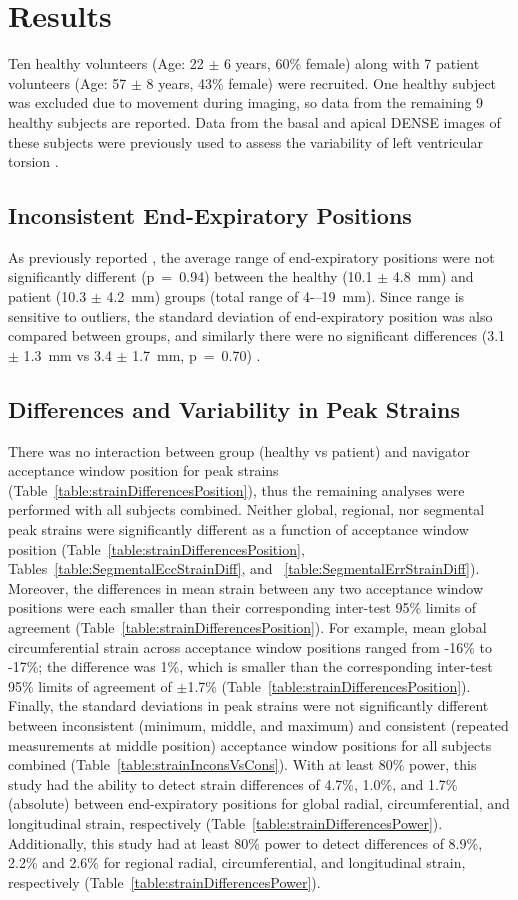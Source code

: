 \section{Results}
	Ten healthy volunteers (Age: 22 $\pm$ 6 years, 60\% female) along with 7 patient volunteers (Age: 57 $\pm$ 8 years, 43\% female) were recruited. One healthy subject was excluded due to movement during imaging, so data from the remaining 9 healthy subjects are reported. Data from the basal and apical DENSE images of these subjects were previously used to assess the variability of left ventricular torsion \cite{Hamlet2017}.
	
\subsection{Inconsistent End-Expiratory Positions}
	As previously reported \cite{Hamlet2017}, the average range of end-expiratory positions were not significantly different (p~=~0.94) between the healthy (10.1 $\pm$ 4.8~mm) and patient (10.3 $\pm$ 4.2~mm) groups (total range of 4-–19~mm). Since range is sensitive to outliers, the standard deviation of end-expiratory position was also compared between groups, and similarly there were no significant differences (3.1 $\pm$ 1.3~mm vs 3.4 $\pm$ 1.7~mm, p~=~0.70) \cite{Hamlet2017}.
	
\subsection{Differences and Variability in Peak Strains}
	There was no interaction between group (healthy vs patient) and navigator acceptance window position for peak strains (Table~\ref{table:strainDifferencesPosition}), thus the remaining analyses were performed with all subjects combined. Neither global, regional, nor segmental peak strains were significantly different as a function of acceptance window position (Table~\ref{table:strainDifferencesPosition}, Tables~\ref{table:SegmentalEccStrainDiff}, and ~\ref{table:SegmentalErrStrainDiff}). Moreover, the differences in mean strain between any two acceptance window positions were each smaller than their corresponding inter-test 95\% limits of agreement (Table~\ref{table:strainDifferencesPosition}). For example, mean global circumferential strain across acceptance window positions ranged from -16\% to -17\%; the difference was 1\%, which is smaller than the corresponding inter-test 95\% limits of agreement of $\pm$1.7\% (Table~\ref{table:strainDifferencesPosition}). Finally, the standard deviations in peak strains were not significantly different between inconsistent (minimum, middle, and maximum) and consistent (repeated measurements at middle position) acceptance window positions for all subjects combined (Table~\ref{table:strainInconsVsCons}). With at least 80\% power, this study had the ability to detect strain differences of 4.7\%, 1.0\%, and 1.7\% (absolute) between end-expiratory positions for global radial, circumferential, and longitudinal strain, respectively (Table~\ref{table:strainDifferencesPower}). Additionally, this study had at least 80\% power to detect differences of 8.9\%, 2.2\% and 2.6\% for regional radial, circumferential, and longitudinal strain, respectively (Table~\ref{table:strainDifferencesPower}).
	
